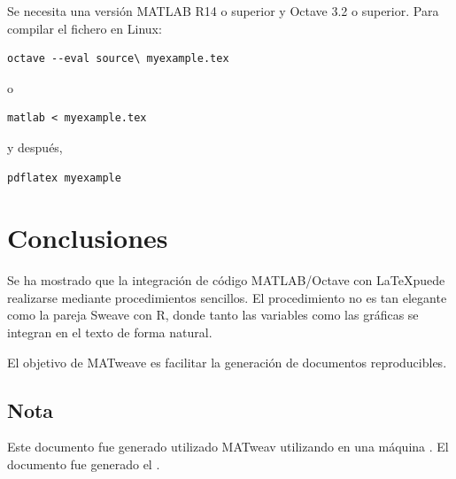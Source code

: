 \documentclass{article}
\begin{document}
Se necesita una versión MATLAB R14 o superior y Octave 3.2 o superior.  Para compilar el fichero en Linux: 

\begin{verbatim}
octave --eval source\ myexample.tex
\end{verbatim}

o

\begin{verbatim}
matlab < myexample.tex
\end{verbatim}

y después,

\begin{verbatim}
pdflatex myexample
\end{verbatim}

\section{Conclusiones}

Se ha mostrado que la integración de código MATLAB/Octave con \LaTeX puede realizarse mediante procedimientos sencillos. El procedimiento no es tan elegante como la pareja Sweave con R, donde tanto las variables como las gráficas se integran en el texto de forma natural.

El objetivo de MATweave es facilitar la generación de documentos reproducibles.

\subsection*{Nota}

Este documento fue generado utilizado MATweav utilizando  en una máquina . El documento fue generado el .



\end{document}
